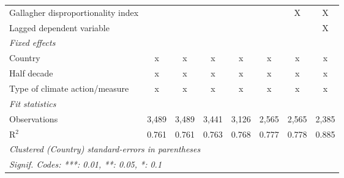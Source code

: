 \begin{table}[htbp]
\begin{tabular}{lccccccc}
      Gallagher disproportionality index                          &              &              &              &         &         & X       & X\\  
      Lagged dependent variable                                   &              &              &              &         &         &         & X\\  
      \emph{Fixed effects}\\
      Country                                                     & x            & x            & x            & x       & x       & x       & x\\  
      Half decade                                                 & x            & x            & x            & x       & x       & x       & x\\  
      Type of climate action/measure                              & x            & x            & x            & x       & x       & x       & x\\  
      \midrule \emph{Fit statistics}\\
      Observations                                                & 3,489        & 3,489        & 3,441        & 3,126   & 2,565   & 2,565   & 2,385\\  
      R$^2$                                                       & 0.761        & 0.761        & 0.763        & 0.768   & 0.777   & 0.778   & 0.885\\  
      \midrule
      \multicolumn{8}{l}{\emph{Clustered (Country) standard-errors in parentheses}}\\
      \multicolumn{8}{l}{\emph{Signif. Codes: ***: 0.01, **: 0.05, *: 0.1}}\\
   \end{tabular}
\end{table}


